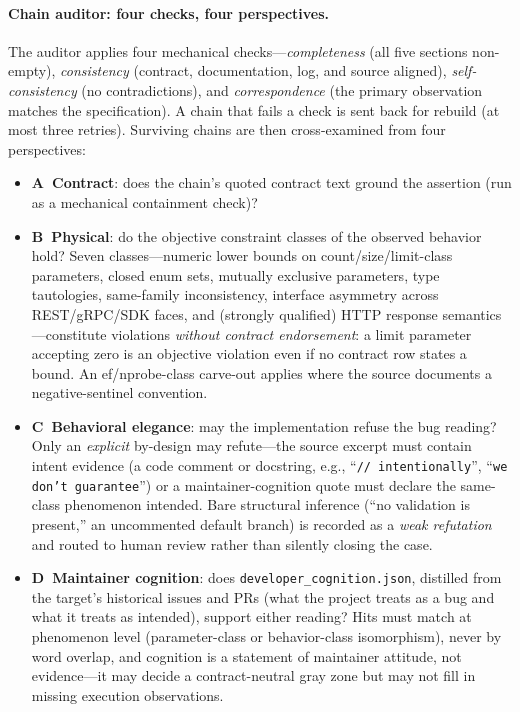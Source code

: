 \documentclass[acmsmall,screen,review,anonymous]{acmart}
\begin{document}
\paragraph{Chain auditor: four checks, four perspectives.}
The auditor applies four mechanical checks---\emph{completeness} (all five sections non-empty), \emph{consistency} (contract, documentation, log, and source aligned), \emph{self-consistency} (no contradictions), and \emph{correspondence} (the primary observation matches the specification). A chain that fails a check is sent back for rebuild (at most three retries). Surviving chains are then cross-examined from four perspectives:
\begin{itemize}
  \item \textbf{A~Contract}: does the chain's quoted contract text ground the assertion (run as a mechanical containment check)?
  \item \textbf{B~Physical}: do the objective constraint classes of the observed behavior hold? Seven classes---numeric lower bounds on count/size/limit-class parameters, closed enum sets, mutually exclusive parameters, type tautologies, same-family inconsistency, interface asymmetry across REST/gRPC/SDK faces, and (strongly qualified) HTTP response semantics---constitute violations \emph{without contract endorsement}: a limit parameter accepting zero is an objective violation even if no contract row states a bound. An ef/nprobe-class carve-out applies where the source documents a negative-sentinel convention.
  \item \textbf{C~Behavioral elegance}: may the implementation refuse the bug reading? Only an \emph{explicit} by-design may refute---the source excerpt must contain intent evidence (a code comment or docstring, e.g., ``\texttt{// intentionally}'', ``\texttt{we don't guarantee}'') or a maintainer-cognition quote must declare the same-class phenomenon intended. Bare structural inference (``no validation is present,'' an uncommented default branch) is recorded as a \emph{weak refutation} and routed to human review rather than silently closing the case.
  \item \textbf{D~Maintainer cognition}: does \texttt{developer\_cognition.json}, distilled from the target's historical issues and PRs (what the project treats as a bug and what it treats as intended), support either reading? Hits must match at phenomenon level (parameter-class or behavior-class isomorphism), never by word overlap, and cognition is a statement of maintainer attitude, not evidence---it may decide a contract-neutral gray zone but may not fill in missing execution observations.
\end{itemize}
\end{document}
